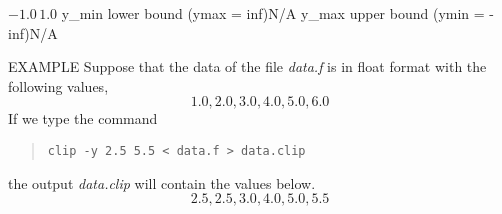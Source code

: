 \begin{options}
		{$-1.0 \, 1.0$}
	 {y_{min}} {lower bound (ymax = inf)}{N/A}
	 {y_{max}} {upper bound (ymin = -inf)}{N/A}
\end{options}

\begin{qsection}{EXAMPLE}
Suppose that the data of the file {\em data.f} is in float format
with the following values,
\begin{displaymath}
 1.0, 2.0, 3.0, 4.0, 5.0, 6.0
\end{displaymath}
If we type the command
\begin{quote}
 \verb!clip -y 2.5 5.5 < data.f > data.clip!
\end{quote}
the output {\em data.clip} will contain the values below.
\begin{displaymath}
 2.5, 2.5, 3.0, 4.0, 5.0, 5.5
\end{displaymath}
\end{qsection}
